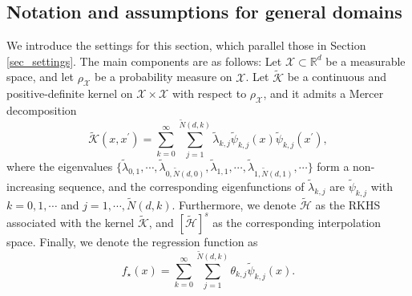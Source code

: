 \documentclass{article}
\theoremstyle{plain}
\theoremstyle{definition}
\theoremstyle{remark}
\newcommand{\bbR}{\mathbb{R}}
\newcommand{\calH}{\mathcal{H}}
\newcommand{\dhnote}[1]{{\color{red}[#1]} } %
\begin{document}
\subsection{Notation and assumptions for general domains}


We introduce the settings for this section, which parallel those in Section \ref{sec_settings}. 
The main components are as follows: 
Let $\mathcal{X} \subset \bbR^{d}$ be a measurable space, and let $\rho_{\mathcal{X}}$ be a probability measure on $\mathcal{X}$.
Let $\tilde{\mathscr{K}}$ be a continuous and positive-definite kernel on $\mathcal{X} \times \mathcal{X}$ with respect to $\rho_{\mathcal{X}}$, and it admits a Mercer decomposition
\begin{equation}\label{eqn_mercer_general}
    \tilde{\mathscr{K}}(x,x^\prime) = \sum_{k=0}^{\infty} \sum_{j=1}^{\tilde{N}(d, k)} \tilde{\lambda}_{k, j}  \tilde{\psi}_{k, j}(x) \tilde{\psi}_{k, j}\left(x^\prime\right),
\end{equation}
where the eigenvalues $\{\tilde{\lambda}_{0, 1}, \cdots, \tilde{\lambda}_{0, \tilde{N}(d, 0)}, \tilde{\lambda}_{1, 1}, \cdots, \tilde{\lambda}_{1, \tilde{N}(d, 1)}, \cdots\}$ form a non-increasing sequence,
and the corresponding eigenfunctions of $\tilde{\lambda}_{k, j}$ are $\tilde{\psi}_{k, j}$ with $k=0, 1, \cdots$ and $j=1, \cdots, \tilde{N}(d, k)$. 
Furthermore, we denote $\tilde{\calH}$ as the RKHS associated with the kernel $\tilde{\mathscr{K}}$, and $[\tilde{\calH}]^{s}$ as the corresponding interpolation space. Finally, we denote the regression function as
    $$
        f_{\star}(x) = \sum_{k=0}^{\infty} \sum_{j=1}^{\tilde{N}(d,k)} \theta_{k,j} \tilde{\psi}_{k,j}(x).
    $$
\end{document}
